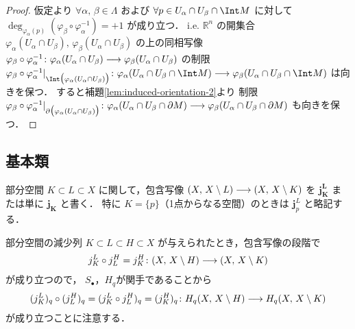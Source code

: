 \documentclass[algtopo_main]{subfiles}
\begin{document}
\begin{proof}
    仮定より $\forall \alpha,\, \beta \in \Lambda$ および $\forall p \in U_\alpha  \cap U_\beta \cap \Int M$ に対して
    $\deg_{\varphi_\alpha(p)} (\varphi_\beta \circ \varphi_\alpha^{-1}) = +1$ が成り立つ．
    i.e. $\mathbb{R}^n$ の開集合 $\varphi_{\alpha}(U_\alpha \cap U_\beta),\, \varphi_{\beta}(U_\alpha \cap U_\beta)$ の上の同相写像 $\varphi_\beta \circ \varphi_\alpha^{-1} \colon \varphi_{\alpha}(U_\alpha \cap U_\beta) \longrightarrow \varphi_{\beta}(U_\alpha \cap U_\beta)$ の制限
    $\varphi_\beta \circ \varphi_\alpha^{-1}|_{\Int \bigl( \varphi_{\alpha}(U_\alpha \cap U_\beta) \bigr)  } \colon \varphi_{\alpha}(U_\alpha \cap U_\beta \cap \Int M) \lto \varphi_{\beta}(U_\alpha \cap U_\beta \cap \Int M)$ は向きを保つ．
    すると補題\ref{lem:induced-orientation-2}より
    制限 $\varphi_\beta \circ \varphi_\alpha^{-1}|_{\partial \bigl( \varphi_{\alpha}(U_\alpha \cap U_\beta) \bigr)  } \colon \varphi_{\alpha}(U_\alpha \cap U_\beta \cap \partial M) \longrightarrow \varphi_{\beta}(U_\alpha \cap U_\beta \cap \partial M)$ も向きを保つ．
\end{proof}



\subsection{基本類}

部分空間 $K \subset L \subset X$ に関して，包含写像 $(X,\, X \setminus L) \longrightarrow (X,\, X\setminus K)$ を $\bm{j_K^L}$ または単に $\bm{j_K}$ と書く．
特に $K = \{p\}$（1点からなる空間）のときは $\bm{j}_p^L$ と略記する．

部分空間の減少列 $K \subset L \subset H \subset X$ が与えられたとき，包含写像の段階で
\begin{align}
    j_K^L \circ j_L^H = j_K^H \colon (X,\, X\setminus H) \longrightarrow (X,\, X \setminus K)
\end{align}
が成り立つので，
\hyperref[thm:cov-SS]{$S_\bullet$}，\hyperref[prop:Hq-functoriality]{$H_q$}が関手であることから
\begin{align}
    (j_K^L)_q \circ (j_L^H)_q = (j_K^L \circ j_L^H)_q = (j_K^H)_q \colon H_q  (X,\, X\setminus H) \longrightarrow H_q (X,\, X\setminus K)
\end{align}
が成り立つことに注意する．
\end{document}
